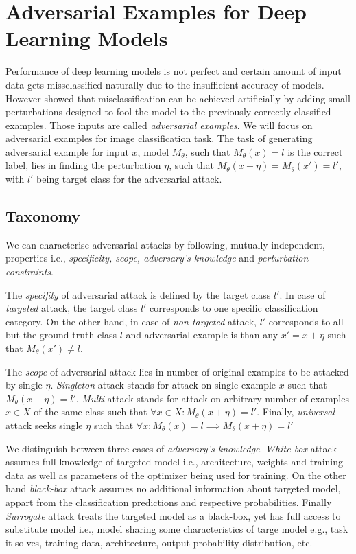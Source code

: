 \chapter{Adversarial Examples for Deep Learning Models}
Performance of deep learning models is not perfect and certain amount of input data gets missclassified naturally due to the insufficient accuracy of models. However \cite{DBLP:journals/corr/SzegedyZSBEGF13} showed that misclassification can be achieved artificially by adding small perturbations designed to fool the model to the previously correctly classified examples. Those inputs are called \emph{adversarial examples}. We will focus on adversarial examples for image classification task.
The task of generating adversarial example for input $x$, model $M_\theta$, such that $M_\theta(x) = l$ is the correct label, lies in finding the perturbation $\eta$, such that $M_\theta(x + \eta) = M_\theta(x') = l'$, with $l'$ being target class for the adversarial attack.

\section{Taxonomy}
We can characterise adversarial attacks by following, mutually independent, properties i.e., \emph{specificity, scope, adversary's knowledge} and \emph{perturbation constraints}.

The \emph{specifity} of adversarial attack is defined by the target class $l'$. In case of \emph{targeted} attack, the target class $l'$ corresponds to one specific classification category. On the other hand, in case of \emph{non-targeted} attack, $l'$ corresponds to all but the ground truth class $l$ and adversarial example is than any $x' = x + \eta$ such that $M_\theta(x') \neq l$.

The \emph{scope} of adversarial attack lies in number of original examples to be attacked by single $\eta$. \emph{Singleton} attack stands for attack on single example $x$ such that $M_\theta(x + \eta) = l'$. \emph{Multi} attack stands for attack on arbitrary number of examples  $x \in X$ of the same class such that $\forall x \in X: M_\theta(x + \eta) = l'$. Finally, \emph{universal} attack seeks single $\eta$ such that $\forall x: M_\theta(x) = l \implies M_\theta(x + \eta) = l'$

We distinguish between three cases of \emph{adversary's knowledge}. \emph{White-box} attack assumes full knowledge of targeted model i.e., architecture, weights and training data as well as parameters of the optimizer being used for training. On the other hand \emph{black-box} attack assumes no additional information about targeted model, appart from the classification predictions and respective probabilities. Finally \emph{Surrogate} attack treats the targeted model as a black-box, yet has full access to substitute model i.e., model sharing some characteristics of targe model e.g., task it solves, training data, architecture, output probability distribution, etc.


